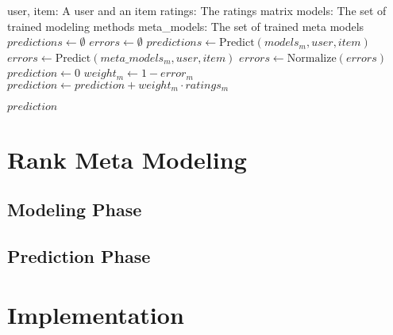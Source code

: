 \begin{algorithm}
  \begin{algorithmic}[1]
  \REQUIRE user, item: A user and an item
  \REQUIRE ratings: The ratings matrix
  \REQUIRE models: The set of trained modeling methods 
  \REQUIRE meta\_models: The set of trained meta models
  \ENSURE
    \STATE $predictions \gets \emptyset$
    \STATE $errors  \gets \emptyset$
      \STATE $predictions \gets \mathrm{Predict}(models_m, user, item)$
      \STATE $errors  \gets \mathrm{Predict}(meta\_models_m, user, item)$
    \ENDFOR 
    \STATE $errors \gets \mathrm{Normalize}(errors)$
    \STATE $prediction \gets 0$
      \STATE $weight_m \gets 1 - error_m$
      \STATE $prediction \gets prediction + weight_m \cdot ratings_m$
    \ENDFOR
 
  \RETURN $prediction$
  \end{algorithmic}
  \caption[Prediction]{Prediction
  }
  \label{code:prediction}
\end{algorithm}




\section{Rank Meta Modeling}
\label{sec:methods:rank}

\subsection{Modeling Phase}

\subsection{Prediction Phase}

\section{Implementation}
